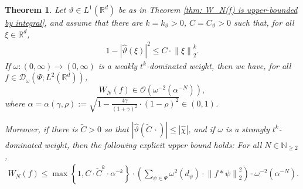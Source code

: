 \documentclass[11pt]{amsart}
\newcommand{\R}{{\mathbb{R}}}
\newcommand{\N}{\mathbb{N}}
\newcommand{\norm}[1]{\ensuremath{\left\lVert\text{}#1\text{}\right\rVert}}
\newtheorem{theorem}{Theorem}[section]
\newenvironment{proof sketch} {\textit{Proof sketch.}}{}
\begin{document}
  \begin{theorem}\label{thm: Convergence rates for W_N(f)}
    Let $\vartheta \in L^1(\R^d)$ be as in Theorem \ref{thm: W_N(f) is upper-bounded by integral}, and assume that there are $k=k_{\vartheta}>0$, $C=C_{\vartheta}>0$ such that, for all $\xi \in \R^d$, 
    \begin{align}\label{ass: order of convergence for 1-|vartheta|^2}
      1-|\widehat{\vartheta}(\xi)|^2\leq C \cdot \norm{\xi}_2^{k}.
    \end{align}
    If $\omega:(0,\infty)\to (0,\infty)$ is a weakly $t^k$-dominated weight, then
    we have, for all $f \in \mathcal{D}_\omega(\Psi;L^2(\R^d))$,  
    \[W_N(f) \in \mathcal{O}\left(\omega^{-2}\left(\alpha^{-N}\right)\right),\]
    where $\alpha=\alpha(\gamma,\rho):=\sqrt{1-\frac{4\gamma}{(1+\gamma)^2}\cdot (1-\rho)^2} \in (0,1)$.
  
    Moreover, if there is $\widetilde{C}>0$ so that $|\widehat{\vartheta}(\widetilde{C} \, \cdot)| \leq |\widehat{\chi}|$, and if $\omega$ is a strongly $t^k$-dominated weight, then the following explicit upper bound holds: For all $N \in \N_{\geq 2}$,
    \begin{align*}
      W_N(f)\leq \max\left\{1,C \cdot \widetilde{C}^k \cdot \alpha^{-k}\right\} \cdot \left(\sum_{\psi \in \Psi} \omega^2(d_\psi) \cdot \norm{f*\psi}_2^2\right) \cdot  \omega^{-2}(\alpha^{-N}).
    \end{align*}
  \end{theorem}
  
\end{document}
